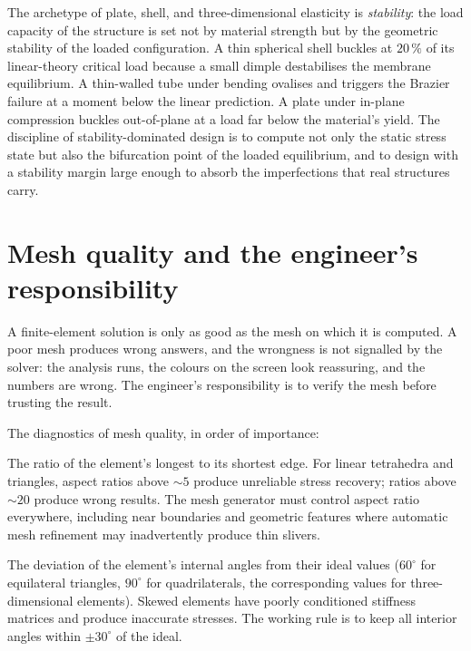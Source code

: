 \begin{archetype}[Stability]
The archetype of plate, shell, and three-dimensional elasticity is
\emph{stability}: the load capacity of the structure is set not by
material strength but by the geometric stability of the loaded
configuration. A thin spherical shell buckles at $20\,\%$ of its
linear-theory critical load because a small dimple destabilises
the membrane equilibrium. A thin-walled tube under bending
ovalises and triggers the Brazier failure at a moment below the
linear prediction. A plate under in-plane compression buckles
out-of-plane at a load far below the material's yield. The
discipline of stability-dominated design is to compute not only
the static stress state but also the bifurcation point of the
loaded equilibrium, and to design with a stability margin large
enough to absorb the imperfections that real structures carry.
\end{archetype}

\section{Mesh quality and the engineer's responsibility}

A finite-element solution is only as good as the mesh on which it
is computed. A poor mesh produces wrong answers, and the wrongness
is not signalled by the solver: the analysis runs, the colours on
the screen look reassuring, and the numbers are wrong. The
engineer's responsibility is to verify the mesh before trusting
the result.

The diagnostics of mesh quality, in order of importance:

 The ratio of the element's longest
to its shortest edge. For linear tetrahedra and triangles, aspect
ratios above $\sim 5$ produce unreliable stress recovery;
ratios above $\sim 20$ produce wrong results. The mesh generator
must control aspect ratio everywhere, including near boundaries
and geometric features where automatic mesh refinement may
inadvertently produce thin slivers.

 The deviation of the element's
internal angles from their ideal values ($60^{\circ}$ for
equilateral triangles, $90^{\circ}$ for quadrilaterals, the
corresponding values for three-dimensional elements). Skewed
elements have poorly conditioned stiffness matrices and produce
inaccurate stresses. The working rule is to keep all interior
angles within $\pm 30^{\circ}$ of the ideal.

